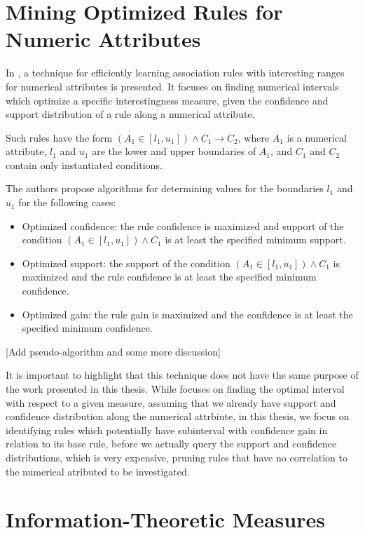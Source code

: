 \section{Mining Optimized Rules for Numeric Attributes}
\label{sec:rw-miningOptimizedRules}

In \cite{Brin99miningoptimized}, a technique for efficiently learning association rules with interesting ranges for
numerical attributes is presented. It focuses on finding numerical intervals which optimize a specific interestingness
measure, given the confidence and support distribution of a rule along a numerical attribute. 

Such rules have the form $(A_1 \in [l_1,u_1]) \wedge C_1 \rightarrow C_2$, where
$A_1$ is a numerical attribute, $l_1$ and $u_1$ are the lower and upper boundaries of $A_1$, and $C_1$ and $C_2$
contain
only instantiated conditions.

The authors propose algorithms for determining values for the boundaries $l_1$ and $u_1$ for the following cases:

\begin{itemize}
 \item Optimized confidence: the rule confidence is maximized and  support of the condition $(A_1 \in [l_1,u_1])
\wedge
C_1$ is at least the specified minimum support.
  \item Optimized support: the support of the condition $(A_1 \in [l_1,u_1]) \wedge C_1$ is maximized and the rule
confidence is at least the specified minimum confidence.
  \item Optimized gain: the rule gain is maximized and the confidence is at least the specified minimum confidence.
\end{itemize}

[Add pseudo-algorithm and some more discussion]

It is important to highlight that this technique does not have the same purpose of the work presented in this thesis.
While \cite{Brin99miningoptimized} focuses on finding the optimal interval with respect to a given measure, assuming
that we already have support and confidence distribution along the numerical attrbiute, in this thesis, we focus on
identifying rules which potentially have subinterval with confidence gain in relation to its base rule, before we
actually query the support and confidence distributions, which is very expensive, pruning rules that have no
correlation to the numerical atributed to be investigated. 

\section{Information-Theoretic Measures}
\label{sec:rw-infotheoreticmeasures}

